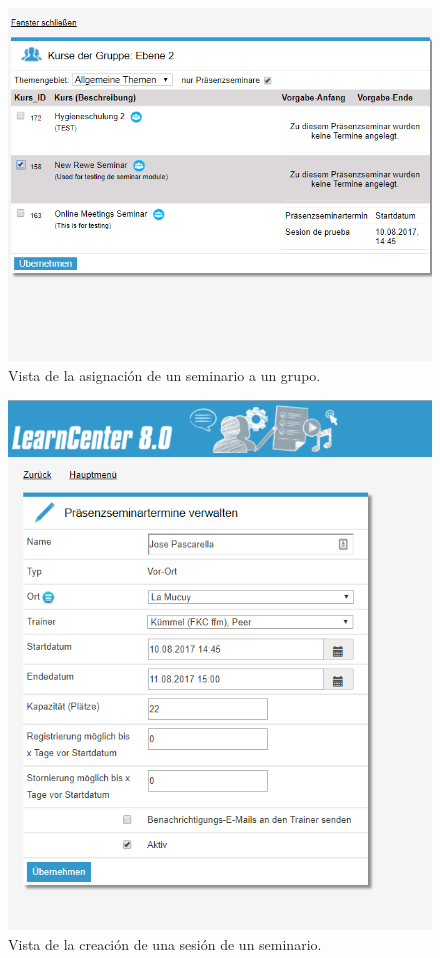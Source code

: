 \begin{figure}[h]
	\begin{center}
		\includegraphics[width=\textwidth]{screenshots/asignar_seminario.png}
		\caption{Vista de la asignación de un seminario a un grupo.} \label{fig:asignarSeminario}
	\end{center}
\end{figure}

\begin{figure}[h]
	\begin{center}
		\includegraphics[width=\textwidth]{screenshots/creacion_seminario_sesion.png}
		\caption{Vista de la creación de una sesión de un seminario.} \label{fig:creacionSesion}
	\end{center}
\end{figure}

